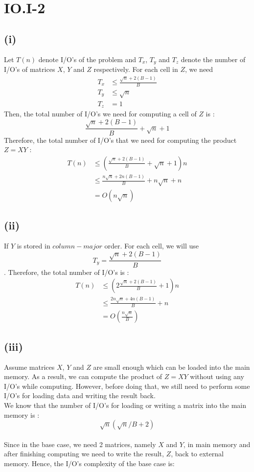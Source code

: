 \section*{IO.I-2}
\subsection*{(i)}
Let $T(n)$ denote I/O's of the problem and $T_x$, $T_y$ and $T_z$ denote the number of I/O's of matrices $X$, $Y$ and $Z$ respectively.
For each cell in $Z$, we need
\begin{align*}
	T_x &\leq \frac{\sqrt{n}+2(B-1)}{B}\\
	T_y &\leq \sqrt{n} \\
	T_z &= 1
\end{align*}
Then, the total number of I/O's we need for computing a cell of $Z$ is :
$$\frac{\sqrt{n}+2(B-1)}{B} + \sqrt{n} + 1$$
Therefore, the total number of I/O's that we need for computing the product $Z=XY$ :
\begin{align*}
	T(n) &\leq ( \frac{\sqrt{n}+2(B-1)}{B} + \sqrt{n} + 1	)n\\
	&\leq \frac{n\sqrt{n}+2n(B-1)}{B} + n\sqrt{n} + n \\
	&= O(n\sqrt{n})
\end{align*}

\subsection*{(ii)}
If $Y$ is stored in $column-major$ order. For each cell, we will use $$T_y=\frac{\sqrt{n}+2(B-1)}{B}$$.
Therefore, the total number of I/O's is :
\begin{align*}
	T(n) &\leq ( 2\frac{\sqrt{n}+2(B-1)}{B} + 1	)n\\
	&\leq \frac{2n\sqrt{n}+4n(B-1)}{B} + n \\
	&= O(\frac{n\sqrt{n}}{B})
\end{align*}

\subsection*{(iii)}

Assume matrices $X$, $Y$ and $Z$ are small enough which can be loaded into the main memory. As a result, we can compute the product of $Z=XY$
without using any I/O's while computing. However, before doing that, we still need to perform some I/O's for loading data and writing the result back.
\\
We know that the number of I/O's for loading or writing a matrix into the main memory is :
$$\sqrt{n}(\sqrt{n}/B+2)$$
\\
Since in the base case, we need 2 matrices, namely $X$ and $Y$, in main memory and after finishing computing
we need to write the result, $Z$, back to external memory. Hence, the I/O's complexity of the base case is:

